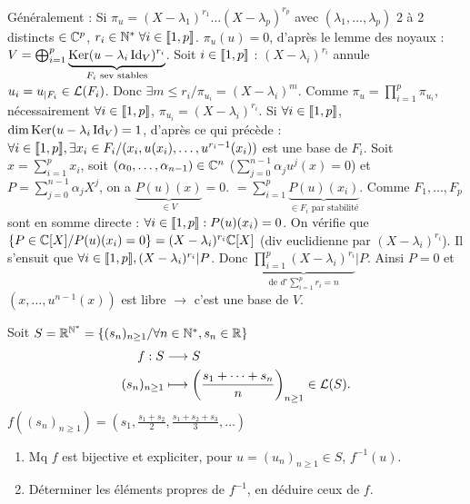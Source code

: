 \begin{solution}
Généralement : Si $\pi_u = (X-\lambda_1)^{r_1} \dots (X-\lambda_p)^{r_p}$
avec $(\lambda_1, \dots, \lambda_p)$ 2 à 2 distincts $\in \mathbb C^p$, $r_i \in \mathbb N^* \; \forall i \in \llbracket 1,p\rrbracket$.
$\pi_u(u) = 0$, d'après le lemme des noyaux :
$V = \bigoplus_{i=1}^p \underbrace{\operatorname{Ker}(u - \lambda_i \operatorname{Id}_V)^{r_i}}_{F_i \text{ sev stables}}$.
Soit $i \in \llbracket 1,p\rrbracket$ : $(X-\lambda_i)^{r_i}$ annule $u_i = u_{|F_i} \in \mathcal L(F_i)$.
Donc $\exists m \leq r_i / \pi_{u_i} = (X-\lambda_i)^m$.
Comme $\pi_u = \prod_{i=1}^p \pi_{u_i}$, nécessairement
$\forall i \in \llbracket 1,p\rrbracket$, $\pi_{u_i} = (X-\lambda_i)^{r_i}$.
Si $\forall i \in \llbracket 1,p\rrbracket$, $\dim \operatorname{Ker}(u - \lambda_i \operatorname{Id}_V) = 1$, d'après ce qui précède :
$\forall i \in \llbracket 1,p\rrbracket, \exists x_i \in F_i / (x_i, u(x_i), \dots, u^{r_i-1}(x_i))$ est une base de $F_i$.
Soit $x = \sum_{i=1}^p x_i$, soit $(\alpha_0, \dots, \alpha_{n-1}) \in \mathbb C^n$ ($\sum_{j=0}^{n-1} \alpha_j u^j(x) = 0$)
et $P = \sum_{j=0}^{n-1} \alpha_j X^j$, on a $\underbrace{P(u)(x)}_{\in V} = 0$.
$= \sum_{i=1}^p \underbrace{P(u)(x_i)}_{\in F_i \text{ par stabilité}}$.
Comme $F_1, \dots, F_p$ sont en somme directe :
$\forall i \in \llbracket 1,p\rrbracket : P(u)(x_i) = 0$.
On vérifie que $\{P \in \mathbb C[X] / P(u)(x_i) = 0\} = (X-\lambda_i)^{r_i}\mathbb C[X]$ (div euclidienne par $(X-\lambda_i)^{r_i}$).
Il s'ensuit que $\forall i \in \llbracket 1,p\rrbracket, (X-\lambda_i)^{r_i} | P$.
Donc $\underbrace{\prod_{i=1}^p (X-\lambda_i)^{r_i}}_{\text{de } d^\circ \sum_{i=1}^p r_i = n} | P$.
Ainsi $P=0$ et $(x, \dots, u^{n-1}(x))$ est libre $\to$ c'est une base de $V$.
\end{solution}


\begin{statementbox}
Soit $S = \mathbb R^{\mathbb N^*} = \{ (s_n)_{n \geq 1} / \forall n \in \mathbb N^*, s_n \in \mathbb R \}$
\[
\begin{aligned}
f : S &\longrightarrow S \\
(s_n)_{n \geq 1} &\longmapsto \left(\frac{s_1 + \dots + s_n}{n}\right)_{n \geq 1} \in \mathcal L(S).
\end{aligned}
\]
$f((s_n)_{n \geq 1}) = \left(s_1, \frac{s_1+s_2}{2}, \frac{s_1+s_2+s_3}{3}, \dots\right)$
\begin{enumerate}[label=\alph*)]
  \item Mq $f$ est bijective et expliciter, pour $u = (u_n)_{n \geq 1} \in S$, $f^{-1}(u)$.
  \item Déterminer les éléments propres de $f^{-1}$, en déduire ceux de $f$.
\end{enumerate}
\end{statementbox}

